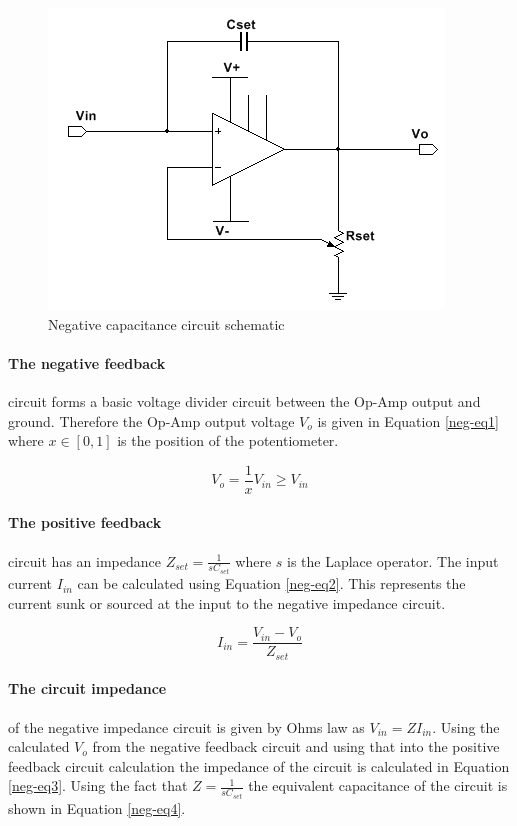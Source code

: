\begin{figure}
	\begin{center}
		\includegraphics[width=.6\textwidth]{Images/neg-cap-circ.png}
		\caption{Negative capacitance circuit schematic\label{neg-fig-1}}
	\end{center}
\end{figure}

\paragraph{The negative feedback} circuit forms a basic voltage divider circuit between the Op-Amp output and ground.  Therefore the Op-Amp output voltage $V_o$ is given in Equation \ref{neg-eq1} where $x\in[0,1]$ is the position of the potentiometer.

\begin{equation}
	V_o=\frac{1}{x}V_{in}\geq V_{in}\label{neg-eq1}
\end{equation}

\paragraph{The positive feedback} circuit has an impedance $Z_{set}=\frac{1}{sC_{set}}$ where $s$ is the Laplace operator.  The input current $I_{in}$ can be calculated using Equation \ref{neg-eq2}.  This represents the current sunk or sourced at the input to the negative impedance circuit.

\begin{equation}
	I_{in}=\frac{V_{in}-V_o}{Z_{set}}\label{neg-eq2}
\end{equation}

\paragraph{The circuit impedance} of the negative impedance circuit is given by Ohms law as $V_{in}=ZI_{in}$.  Using the calculated $V_o$ from the negative feedback circuit and using that into the positive feedback circuit calculation the impedance of the circuit is calculated in Equation \ref{neg-eq3}.  Using the fact that $Z=\frac{1}{sC_{set}}$ the equivalent capacitance of the circuit is shown in Equation \ref{neg-eq4}.

